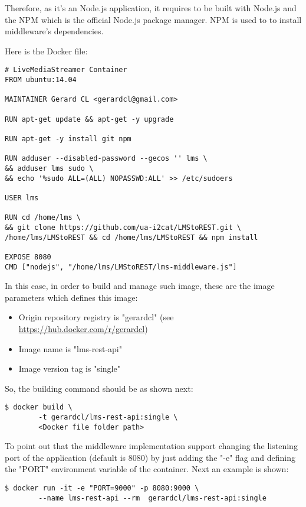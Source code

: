 Therefore, as it's an Node.js application, it requires to be built with Node.js and the NPM which is the official Node.js package manager. NPM is used to to install middleware's dependencies. 

Here is the Docker file:
\begin{verbatim}
# LiveMediaStreamer Container
FROM ubuntu:14.04

MAINTAINER Gerard CL <gerardcl@gmail.com>

RUN apt-get update && apt-get -y upgrade

RUN apt-get -y install git npm

RUN adduser --disabled-password --gecos '' lms \
&& adduser lms sudo \
&& echo '%sudo ALL=(ALL) NOPASSWD:ALL' >> /etc/sudoers

USER lms

RUN cd /home/lms \
&& git clone https://github.com/ua-i2cat/LMStoREST.git \
/home/lms/LMStoREST && cd /home/lms/LMStoREST && npm install

EXPOSE 8080
CMD ["nodejs", "/home/lms/LMStoREST/lms-middleware.js"]
\end{verbatim}

In this case, in order to build and manage such image, these are the image parameters which defines this image:

\begin{itemize}
\item Origin repository registry is "gerardcl" (see \url{https://hub.docker.com/r/gerardcl})
\item Image name is "lms-rest-api"
\item Image version tag is "single"
\end{itemize}

So, the building command should be as shown next:

\begin{verbatim}
$ docker build \
		-t gerardcl/lms-rest-api:single \
		<Docker file folder path>
\end{verbatim}

To point out that the middleware implementation support changing the listening port of the application (default is 8080) by just adding the "-e" flag and defining the "PORT" environment variable of the container. Next an example is shown:

\begin{verbatim}
$ docker run -it -e "PORT=9000" -p 8080:9000 \
		--name lms-rest-api --rm  gerardcl/lms-rest-api:single
\end{verbatim}

